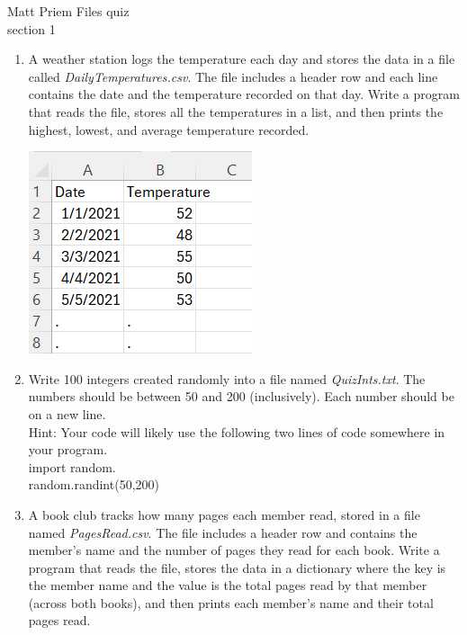 \documentclass{article}
\newcommand{\tab}{\hspace*{0.25in}}
\begin{document}

Matt Priem \hfill Files quiz\\
section 1\\
\begin{enumerate}
	\item 
		A weather station logs the temperature each day and stores the data in a file called \textit{DailyTemperatures.csv}.  
		The file includes a header row and each line contains the date and the temperature recorded on that day.  
		Write a program that reads the file, stores all the temperatures in a list, and then prints the highest, lowest, and average temperature recorded.
		
		\begin{flushright}
			\includegraphics[scale=.65]{imgs/DailyTemperaturesData.PNG}
		\end{flushright}




	\item 
		Write 100 integers created randomly into a file named \textit{QuizInts.txt}. 
		The numbers should be between 50 and 200 (inclusively). 
		Each number should be on a new line.\\
		Hint: Your code will likely use the following two lines of code somewhere in your program.\\
			\tab import random.\\
			\tab random.randint(50,200)

	\item 
		A book club tracks how many pages each member read, stored in a file named 
		\textit{PagesRead.csv}. The file includes a header row and contains the member's 
		name and the number of pages they read for each book.  
		Write a program that reads the file, stores the data in a dictionary where the key is 
		the member name and the value is the total pages read by that member (across both books), 
		and then prints each member's name and their total pages read.
		

\end{enumerate}
\end{document}
